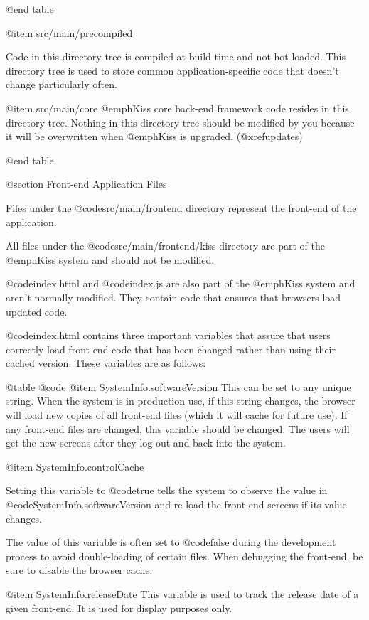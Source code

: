 @end table

@item src/main/precompiled

Code in this directory tree is compiled at build time and not hot-loaded.  This directory tree is used to
store common application-specific code that doesn't change particularly often.

@item src/main/core
@emph{Kiss} core back-end framework code resides in this directory tree. Nothing in this directory tree should be 
modified by you because it will be overwritten when @emph{Kiss} is upgraded.  (@xref{updates})

@end table


@section Front-end Application Files

Files under the @code{src/main/frontend} directory represent the
front-end of the application.

All files under the @code{src/main/frontend/kiss} directory are part of
the @emph{Kiss} system and should not be modified.

@code{index.html} and @code{index.js} are also part of the @emph{Kiss}
system and aren't normally modified.  They contain code that ensures
that browsers load updated code.

@code{index.html} contains three important variables that assure that users correctly load 
front-end code that has been changed rather than using their cached version.  These variables are as follows:

@table @code
@item SystemInfo.softwareVersion
This can be set to any unique string.  When the system is in production use, if this string changes,
the browser will load new copies of all front-end files (which it will cache for future use).
If any front-end files are changed, this variable should be changed.  The users will get the new screens 
after they log out and back into the system.

@item SystemInfo.controlCache

Setting this variable to @code{true} tells the system to observe the value in @code{SystemInfo.softwareVersion}
and re-load the front-end screens if its value changes.

The value of this variable is often set to @code{false} during the development process to avoid double-loading
of certain files.   When debugging the front-end, be sure to disable the browser cache.

@item SystemInfo.releaseDate 
This variable is used to track the release date of a given front-end.  It is used for display purposes only.

